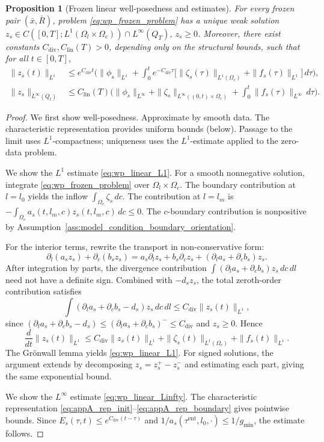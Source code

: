 \documentclass[pdflatex,sn-mathphys-num]{sn-jnl}%
\newtheorem{proposition}[theorem]{Proposition}
\begin{document}
\begin{proposition}[Frozen linear well-posedness and estimates]\label{prop:wp_linear_package}
For every frozen pair \((\bar x,\bar R)\), problem
\eqref{eq:wp_frozen_problem} has a unique weak solution
\(z_s\in C([0,T];L^1(\Omega_l\times\Omega_c))\cap L^\infty(Q_T)\),
\(z_s\ge 0\).
Moreover, there exist constants \(C_{\mathrm{div}},C_{\mathrm{lin}}(T)>0\), depending
only on the structural bounds, such that for all \(t\in[0,T]\),
\begin{align}
\|z_s(t)\|_{L^1}
&\le
e^{C_{\mathrm{div}}t}\Big(
\|\phi_s\|_{L^1}
+\int_0^t e^{-C_{\mathrm{div}}\tau}\big[\|\zeta_s(\tau)\|_{L^1(\Omega_c)}
+\|f_s(\tau)\|_{L^1}\big]\,d\tau
\Big),
\label{eq:wp_linear_L1}
\\
\|z_s\|_{L^\infty(Q_t)}
&\le
C_{\mathrm{lin}}(T)\Big(
\|\phi_s\|_{L^\infty}
+\|\zeta_s\|_{L^\infty((0,t)\times\Omega_c)}
+\int_0^t\|f_s(\tau)\|_{L^\infty}\,d\tau
\Big).
\label{eq:wp_linear_Linfty}
\end{align}
\end{proposition}
\begin{proof}
We first show well-posedness. Approximate by smooth data. The characteristic representation provides uniform
bounds (below). Passage to the limit uses \(L^1\)-compactness; uniqueness uses the
\(L^1\)-estimate applied to the zero-data problem.

We show the $L^1$ estimate \eqref{eq:wp_linear_L1}.
For a smooth nonnegative solution, integrate \eqref{eq:wp_frozen_problem} over
\(\Omega_l\times\Omega_c\). The boundary contribution at \(l=l_0\) yields the
inflow \(\int_{\Omega_c}\zeta_s\,dc\). The contribution at \(l=l_m\) is
\(-\int_{\Omega_c}a_s(t,l_m,c)z_s(t,l_m,c)\,dc\le 0\). The \(c\)-boundary
contribution is nonpositive by Assumption~\ref{ass:model_condition_boundary_orientation}.

For the interior terms, rewrite the transport in non-conservative form:
\[
\partial_l(a_s z_s)+\partial_c(b_s z_s)
=a_s\partial_l z_s+b_s\partial_c z_s+(\partial_l a_s+\partial_c b_s)z_s.
\]
After integration by parts, the divergence contribution
\(\int(\partial_l a_s+\partial_c b_s)z_s\,dc\,dl\)
need not have a definite sign. Combined with \(-d_s z_s\), the total zeroth-order
contribution satisfies
\[
\int(\partial_l a_s+\partial_c b_s-d_s)z_s\,dc\,dl
\le C_{\mathrm{div}}\|z_s(t)\|_{L^1},
\]
since \((\partial_l a_s+\partial_c b_s-d_s)\le(\partial_l a_s+\partial_c b_s)^-\le C_{\mathrm{div}}\)
and \(z_s\ge 0\). Hence
\[
\frac{d}{dt}\|z_s(t)\|_{L^1}
\le C_{\mathrm{div}}\|z_s(t)\|_{L^1}
+\|\zeta_s(t)\|_{L^1(\Omega_c)}+\|f_s(t)\|_{L^1}.
\]
The Gr\"onwall lemma yields \eqref{eq:wp_linear_L1}. For signed solutions, the argument extends
by decomposing \(z_s=z_s^+-z_s^-\) and estimating each part, giving the same exponential
bound.

We show the $L^\infty$ estimate \eqref{eq:wp_linear_Linfty}.
The characteristic representation
\eqref{eq:appA_rep_init}--\eqref{eq:appA_rep_boundary} gives pointwise bounds.
Since \(E_s(\tau,t)\le e^{C_{\mathrm{div}}(t-\tau)}\) and
\(1/a_s(\tau^{\mathrm{ent}},l_0,\cdot)\le 1/g_{\min}\), the estimate follows.
\end{proof}
\end{document}

